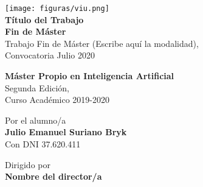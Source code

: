 \begin{titlepage}
  \begin{center}
    \texttt{[image: figuras/viu.png]} \\[1cm]

    \huge \textbf{Título del Trabajo} \\
    \huge \textbf{Fin de Máster} \\[1cm]

    \large Trabajo Fin de Máster (Escribe aquí la modalidad), \\
    \large Convocatoria Julio 2020 \\

    \vspace{2cm}

    \Large \textbf{Máster Propio en Inteligencia Artificial} \\[0.5cm]
    \large Segunda Edición, \\
    \large Curso Académico 2019-2020 \\

    \vspace{2cm}

    \large Por el alumno/a \\
    \Large \textbf{Julio Emanuel Suriano Bryk} \\
    \large Con DNI 37.620.411 \\[1cm]

    \vspace{1cm}

    \large Dirigido por \\
    \Large \textbf{Nombre del director/a} \\
  \end{center}
\end{titlepage}